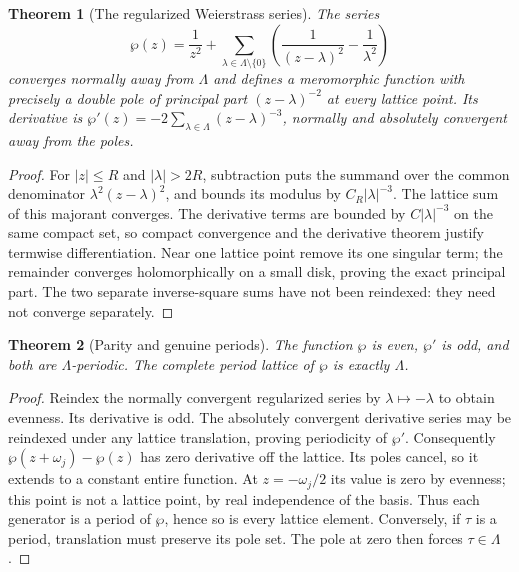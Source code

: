 \documentclass[11pt,a4paper,openany]{book}
\newtheorem{theorem}{Theorem}[chapter]
\theoremstyle{definition}
\theoremstyle{remark}\newtheorem{remark}[theorem]{Remark}
\newcommand{\family}[1]{}
\begin{document}
\begin{theorem}[The regularized Weierstrass series]\label{d12:22-04}\family{D12.22.04}
The series
\[
 \wp(z)=\frac1{z^2}+\sum_{\lambda\in\Lambda\setminus\{0\}}
              \left(\frac1{(z-\lambda)^2}-\frac1{\lambda^2}\right)
\]
converges normally away from $\Lambda$ and defines a meromorphic
function with precisely a double pole of principal part
$(z-\lambda)^{-2}$ at every lattice point. Its derivative is
$\wp'(z)=-2\sum_{\lambda\in\Lambda}(z-\lambda)^{-3}$, normally and
absolutely convergent away from the poles.
\end{theorem}
\begin{proof}
For $|z|\le R$ and $|\lambda|>2R$, subtraction puts the summand over
the common denominator $\lambda^2(z-\lambda)^2$, and bounds its
modulus by $C_R|\lambda|^{-3}$. The lattice sum of this majorant
converges. The derivative terms are bounded by $C|\lambda|^{-3}$ on
the same compact set, so compact convergence and the derivative theorem
justify termwise differentiation. Near one lattice point remove its
one singular term; the remainder converges holomorphically on a small
disk, proving the exact principal part. The two separate inverse-square
sums have not been reindexed: they need not converge separately.
\end{proof}

\begin{theorem}[Parity and genuine periods]\label{d12:22-05}\family{D12.22.05}
The function $\wp$ is even, $\wp'$ is odd, and both are
$\Lambda$-periodic. The complete period lattice of $\wp$ is exactly
$\Lambda$.
\end{theorem}
\begin{proof}
Reindex the normally convergent regularized series by
$\lambda\mapsto-\lambda$ to obtain evenness. Its derivative is odd.
The absolutely convergent derivative series may be reindexed under
any lattice translation, proving periodicity of $\wp'$. Consequently
$\wp(z+\omega_j)-\wp(z)$ has zero derivative off the lattice.
Its poles cancel, so it extends to a constant entire function. At
$z=-\omega_j/2$ its value is zero by evenness; this point is not a
lattice point, by real independence of the basis. Thus each generator
is a period of $\wp$, hence so is every lattice element. Conversely,
if $\tau$ is a period, translation must preserve its pole set. The pole
at zero then forces $\tau\in\Lambda$.
\end{proof}
\end{document}
